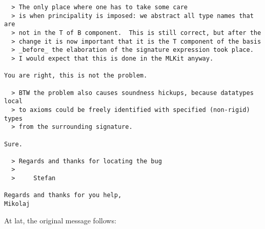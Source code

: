 \documentclass[12pt,a4paper]{article}
\begin{document}
{\begin{verbatim}
  > The only place where one has to take some care
  > is when principality is imposed: we abstract all type names that are
  > not in the T of B component.  This is still correct, but after the
  > change it is now important that it is the T component of the basis
  > _before_ the elaboration of the signature expression took place.
  > I would expect that this is done in the MLKit anyway.

You are right, this is not the problem.

  > BTW the problem also causes soundness hickups, because datatypes local
  > to axioms could be freely identified with specified (non-rigid) types
  > from the surrounding signature.

Sure.

  > Regards and thanks for locating the bug
  > 
  >     Stefan

Regards and thanks for you help,
Mikolaj
\end{verbatim}}

At lat, the original message follows:
\end{document}

